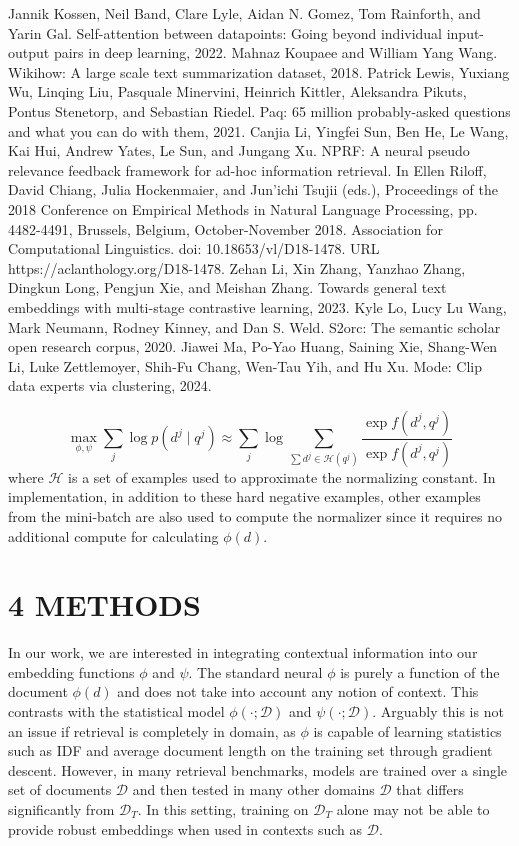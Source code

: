 Jannik Kossen, Neil Band, Clare Lyle, Aidan N. Gomez, Tom Rainforth, and Yarin Gal. Self-attention between datapoints: Going beyond individual input-output pairs in deep learning, 2022.
Mahnaz Koupaee and William Yang Wang. Wikihow: A large scale text summarization dataset, 2018.
Patrick Lewis, Yuxiang Wu, Linqing Liu, Pasquale Minervini, Heinrich Kittler, Aleksandra Pikuts, Pontus Stenetorp, and Sebastian Riedel. Paq: 65 million probably-asked questions and what you can do with them, 2021.
Canjia Li, Yingfei Sun, Ben He, Le Wang, Kai Hui, Andrew Yates, Le Sun, and Jungang Xu. NPRF: A neural pseudo relevance feedback framework for ad-hoc information retrieval. In Ellen Riloff, David Chiang, Julia Hockenmaier, and Jun'ichi Tsujii (eds.), Proceedings of the 2018 Conference on Empirical Methods in Natural Language Processing, pp. 4482-4491, Brussels, Belgium, October-November 2018. Association for Computational Linguistics. doi: 10.18653/vl/D18-1478. URL https://aclanthology.org/D18-1478.
Zehan Li, Xin Zhang, Yanzhao Zhang, Dingkun Long, Pengjun Xie, and Meishan Zhang. Towards general text embeddings with multi-stage contrastive learning, 2023.
Kyle Lo, Lucy Lu Wang, Mark Neumann, Rodney Kinney, and Dan S. Weld. S2orc: The semantic scholar open research corpus, 2020.
Jiawei Ma, Po-Yao Huang, Saining Xie, Shang-Wen Li, Luke Zettlemoyer, Shih-Fu Chang, Wen-Tau Yih, and Hu Xu. Mode: Clip data experts via clustering, 2024.

\[
\max _{\phi, \psi} \sum_{j} \log p\left(d^{j} \mid q^{j}\right) \approx \sum_{j} \log \sum_{\sum d^{j} \in \mathcal{H}\left(q^{j}\right)} \frac{\exp f\left(d^{j}, q^{j}\right)}{\exp f\left(d^{j}, q^{j}\right)}
\]
where \(\mathcal{H}\) is a set of examples used to approximate the normalizing constant. In implementation, in addition to these hard negative examples, other examples from the mini-batch are also used to compute the normalizer since it requires no additional compute for calculating \(\phi(d)\).
\section*{4 METHODS}
In our work, we are interested in integrating contextual information into our embedding functions \(\phi\) and \(\psi\). The standard neural \(\phi\) is purely a function of the document \(\phi(d)\) and does not take into account any notion of context. This contrasts with the statistical model \(\phi(\cdot ; \mathcal{D})\) and \(\psi(\cdot ; \mathcal{D})\). Arguably this is not an issue if retrieval is completely in domain, as \(\phi\) is capable of learning statistics such as IDF and average document length on the training set through gradient descent.
However, in many retrieval benchmarks, models are trained over a single set of documents \(\mathcal{D}\) and then tested in many other domains \(\mathcal{D}\) that differs significantly from \(\mathcal{D}_{T}\). In this setting, training on \(\mathcal{D}_{T}\) alone may not be able to provide robust embeddings when used in contexts such as \(\mathcal{D}\).
